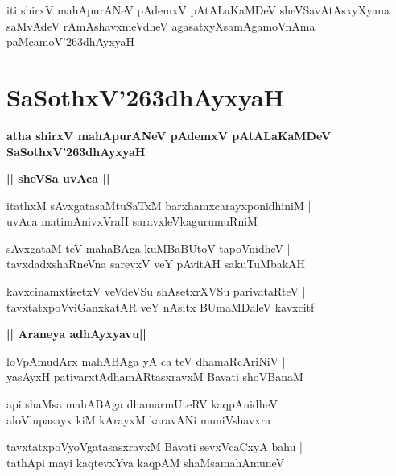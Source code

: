 \documentclass[twoside,12pt,openright]{book}
\def\S{\char'263}
\newcounter{shloka}[chapter]
\def\uvaca#1{\centerline{{\large\textbf{#1}}}}
\begin{document}
\begin{center}
iti shirxV mahApurANeV pAdemxV pAtALaKaMDeV sheVSavAtAsxyXyana saMvAdeV 
rAmAshavxmeVdheV agasatxyXsamAgamoVnAma paMcamoV\S dhAyxyaH
\end{center}

\chapter{SaSothxV\S dhAyxyaH}

\begin{center}
{\LARGE\bfseries atha shirxV mahApurANeV pAdemxV pAtALaKaMDeV SaSothxV\S dhAyxyaH}
\end{center}

\uvaca{|| sheVSa uvAca ||}

\begin{shloka}%
itathxM sAvxgatasaMtuSaTxM barxhamxcarayxponidhiniM |\\
uvAca matimAnivxVraH saravxleVkagurumuRniM 
\end{shloka}

\begin{shloka}%
sAvxgataM teV mahaBAga kuMBaBUtoV tapoVnidheV |\\
tavxdadxshaRneVna sarevxV veY pAvitAH sakuTuMbakAH
\end{shloka}

\begin{shloka}%
kavxcinamxtisetxV veVdeVSu shAsetxrXVSu parivataRteV |\\
tavxtatxpoVviGanxkatAR veY nAsitx BUmaMDaleV kavxcitf
\end{shloka}

\uvaca{|| Araneya adhAyxyavu||}

\begin{shloka}%
loVpAmudArx mahABAga yA ca teV dhamaRcAriNiV |\\
yasAyxH pativarxtAdhamARtasxravxM Bavati shoVBanaM 
\end{shloka}

\begin{shloka}%
api shaMsa mahABAga dhamarmUteRV kaqpAnidheV |\\
aloVlupasayx kiM kArayxM karavANi muniVshavxra
\end{shloka}

\begin{shloka}%
tavxtatxpoVyoVgatasasxravxM Bavati sevxVcaCxyA bahu |\\
tathApi mayi kaqtevxYva kaqpAM shaMsamahAmuneV 
\end{shloka}
\end{document}
